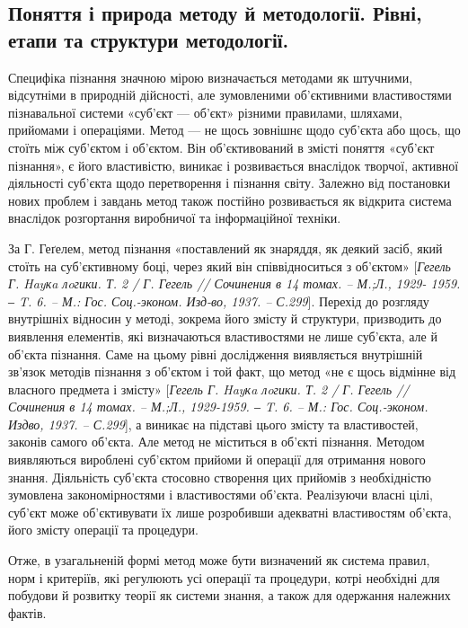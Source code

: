 \subsection[Поняття, природа, рівні і етапи методу й методології.]{Поняття і природа методу й методології. Рівні, етапи та структури методології.}
Специфіка пізнання значною мірою визначається методами як
штучними, відсутніми в природній дійсності, але зумовленими об’єктивними
властивостями пізнавальної системи «суб’єкт --- об’єкт» різними правилами,
шляхами, прийомами і операціями. Метод --- не щось зовнішнє щодо суб’єкта
або щось, що стоїть між суб’єктом і об’єктом. Він об’єктивований в змісті
поняття «суб’єкт пізнання», є його властивістю, виникає і розвивається
внаслідок творчої, активної діяльності суб’єкта щодо перетворення і пізнання
світу. Залежно від постановки нових проблем і завдань метод також постійно
розвивається як відкрита система внаслідок розгортання виробничої та
інформаційної техніки.

За Г. Геґелем, метод пізнання «поставлений як знаряддя, як деякий засіб,
який стоїть на суб’єктивному боці, через який він співвідноситься з об’єктом»
[\textit{Гегель Г. Hayкa лoгики. Т. 2 / Г. Гегель // Сочинения в 14 томах. – М.;Л., 1929-
1959. ‒ T. 6. – М.: Гос. Соц.-эконом. Изд-во, 1937. – С.299}]. Перехід до розгляду
внутрішніх відносин у методі, зокрема його змісту й структури, призводить до
виявлення елементів, які визначаються властивостями не лише суб’єкта, але й
об’єкта пізнання. Саме на цьому рівні дослідження виявляється внутрішній
зв’язок методів пізнання з об’єктом і той факт, що метод «не є щось відмінне
від власного предмета і змісту» [\textit{Гегель Г. Hayкa лoгики. Т. 2 / Г. Гегель //
Сочинения в 14 томах. – М.;Л., 1929-1959. ‒ T. 6. – М.: Гос. Соц.-эконом. Издво, 1937. – С.299}], а виникає на підставі цього змісту та властивостей, законів
самого об’єкта. Але метод не міститься в об’єкті пізнання. Методом
виявляються вироблені суб’єктом прийоми й операції для отримання нового
знання. Діяльність суб’єкта стосовно створення цих прийомів з необхідністю
зумовлена закономірностями і властивостями об’єкта. Реалізуючи власні цілі,
суб’єкт може об’єктивувати їх лише розробивши адекватні властивостям
об’єкта, його змісту операції та процедури.

Отже, в узагальненій формі метод може бути визначений як система правил,
норм і критеріїв, які регулюють усі операції та процедури, котрі необхідні для
побудови й розвитку теорії як системи знання, а також для одержання
належних фактів.

